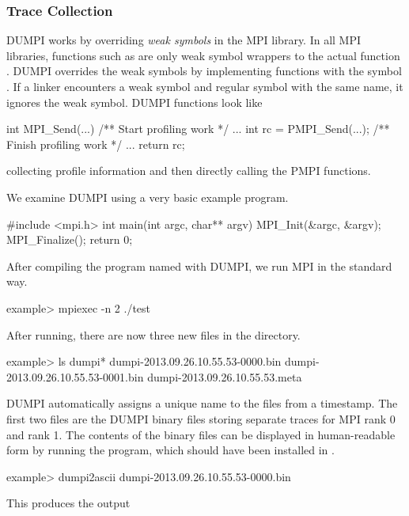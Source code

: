 \subsubsection{Trace Collection}
\label{subsec:dumpi:tracecollection}
DUMPI works by overriding \emph{weak symbols} in the MPI library.
In all MPI libraries, functions such as  are only weak symbol wrappers to the actual function .
DUMPI overrides the weak symbols by implementing functions with the symbol . 
If a linker encounters a weak symbol and regular symbol with the same name, it ignores the weak symbol.
DUMPI functions look like

\begin{CppCode}
int MPI_Send(...)
{
	/** Start profiling work */
	...
	int rc = PMPI_Send(...);
	/** Finish profiling work */
	...
	return rc;
}
\end{CppCode}
collecting profile information and then directly calling the PMPI functions.

We examine DUMPI using a very basic example program.

\begin{CppCode}
#include <mpi.h>
int main(int argc, char** argv)
{
    MPI_Init(&argc, &argv);
    MPI_Finalize();
    return 0;
}
\end{CppCode}
After compiling the program named  with DUMPI, we run MPI in the standard way.

\begin{ShellCmd}
example> mpiexec -n 2 ./test
\end{ShellCmd}
After running, there are now three new files in the directory.

\begin{ShellCmd}
example> ls dumpi*
dumpi-2013.09.26.10.55.53-0000.bin	
dumpi-2013.09.26.10.55.53-0001.bin	
dumpi-2013.09.26.10.55.53.meta
\end{ShellCmd}
DUMPI automatically assigns a unique name to the files from a timestamp.
The first two files are the DUMPI binary files storing separate traces for MPI rank 0 and rank 1.
The contents of the binary files can be displayed in human-readable form by running the 
program, which should have been installed in .

\begin{ShellCmd}
example> dumpi2ascii dumpi-2013.09.26.10.55.53-0000.bin
\end{ShellCmd}
This produces the output

